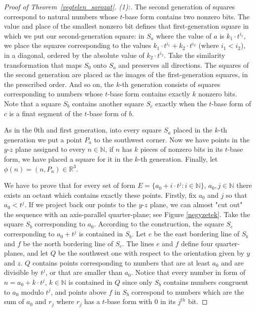 \documentclass[11pt,oneside]{amsart}
\newcommand{\R}{\mathbb{R}}
\begin{document}
\begin{proof}[Proof of Theorem~\ref{vegtelen_sorozat}. (1):]
    The second generation of squares correspond to natural numbers whose $t$-base form contains two nonzero bits. The value and place of the smallest nonzero bit defines that first-generation square in which we put our second-generation square: in $S_a$ where the value of $a$ is $k_1 \cdot t^{i_1}$, we place the squares corresponding to the values $k_1 \cdot t^{i_1} + k_2 \cdot t^{i_2}$ (where $i_1<i_2$), in a diagonal, ordered by the absolute value of $k_2\cdot t^{i_2}$. Take the similarity transformation that maps $S_0$ onto $S_a$ and preserves all directions. The squares of the second generation are placed as the images of the first-generation squares, in the prescribed order. And so on, the $k$-th generation consists of squares corresponding to numbers whose $t$-base form contains exactly $k$ nonzero bits. Note that a square $S_b$ contains another square $S_c$ exactly when the $t$-base form of $c$ is a finat segment of the $t$-base form of $b$. 
    
    As in the 0th and first generation, into every square $S_a$ placed in the $k$-th generation we put a point $P_a$ to the southwest corner. Now we have points in the $y$-$z$ plane assigned to every $n\in\mathbb{N}$, if $n$ has $k$ pieces of nonzero bits in its $t$-base form, we have placed a square for it in the $k$-th generation. Finally, let $\phi (n)=(n,P_n)\in\R^3.$
    
    We have to prove that for every set of form $E = \{a_0+ i \cdot t^j: i \in \mathbb{N}\}$, $a_0, j \in \mathbb{N}$ there exists an octant which contains exactly these points. Firstly, fix $a_0$ and $j$ so that $a_0<t^j$. If we project back our points to the $y$-$z$ plane, we can almost "cut out" the sequence with an axis-parallel quarter-plane; see Figure \ref{negyzetek}. Take the square $S_b$ corresponding to $a_0$. According to the construction, the square $S_c$ corresponding to $a_0 + t^j$ is contained in $S_b$. Let $e$ be the east bordering line of $S_b$ and $f$ be the north bordering line of $S_c$. The lines $e$ and $f$ define four quarter-planes, and let $Q$ be the southwest one with respect to the orientation given by $y$ and $z$. $Q$ contains points corresponding to numbers that are at least $a_0$ and are divisible by $t^j$, or that are smaller than $a_0$. Notice that every number in form of $n=a_0+k \cdot t^j$, $k\in \mathbb{N}$ is contained in $Q$ since only $S_b$ contains numbers congruent to $a_0$ modulo $t^j$, and points above $f$ in $S_b$ correspond to numbers which are the sum of $a_0$ and $r_j$ where $r_j$ has a $t$-base form with $0$ in its $j^{th}$ bit. 
    

\end{proof}
\end{document}
